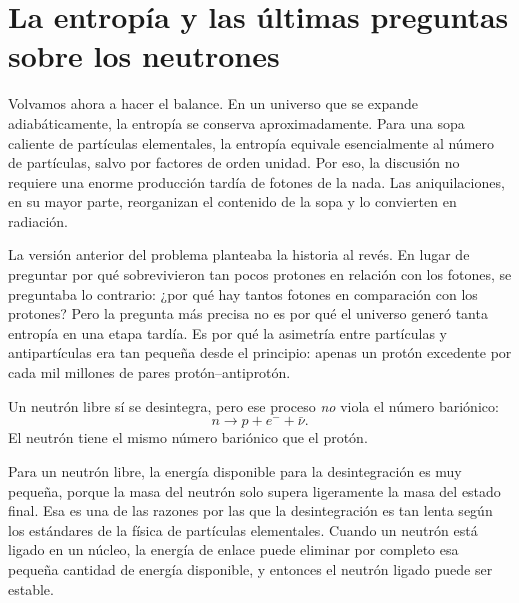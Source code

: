 \section{La entropía y las últimas preguntas sobre los neutrones}

Volvamos ahora a hacer el balance. En un universo que se expande adiabáticamente, la entropía se conserva aproximadamente. Para una sopa caliente de partículas elementales, la entropía equivale esencialmente al número de partículas, salvo por factores de orden unidad. Por eso, la discusión no requiere una enorme producción tardía de fotones de la nada. Las aniquilaciones, en su mayor parte, reorganizan el contenido de la sopa y lo convierten en radiación.

La versión anterior del problema planteaba la historia al revés. En lugar de preguntar por qué sobrevivieron tan pocos protones en relación con los fotones, se preguntaba lo contrario: ¿por qué hay tantos fotones en comparación con los protones? Pero la pregunta más precisa no es por qué el universo generó tanta entropía en una etapa tardía. Es por qué la asimetría entre partículas y antipartículas era tan pequeña desde el principio: apenas un protón excedente por cada mil millones de pares protón--antiprotón.

Un neutrón libre sí se desintegra, pero ese proceso \emph{no} viola el número bariónico:
\[
n \to p + e^- + \bar\nu.
\]
El neutrón tiene el mismo número bariónico que el protón.

Para un neutrón libre, la energía disponible para la desintegración es muy pequeña, porque la masa del neutrón solo supera ligeramente la masa del estado final. Esa es una de las razones por las que la desintegración es tan lenta según los estándares de la física de partículas elementales. Cuando un neutrón está ligado en un núcleo, la energía de enlace puede eliminar por completo esa pequeña cantidad de energía disponible, y entonces el neutrón ligado puede ser estable.

\begin{classroomqa}
\end{classroomqa}